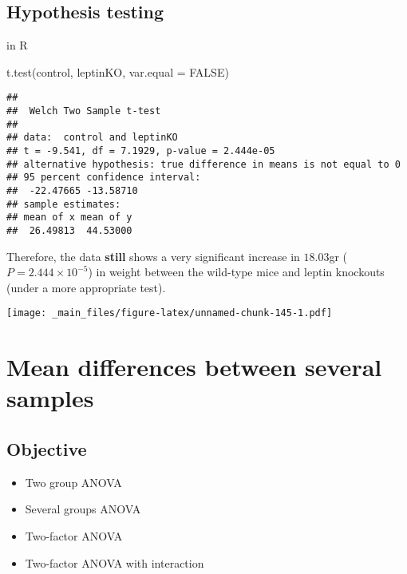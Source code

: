 \documentclass[
]{book}
\newenvironment{Shaded}{\begin{snugshade}}{\end{snugshade}}
\newcommand{\AttributeTok}[1]{\textcolor[rgb]{0.77,0.63,0.00}{#1}}
\newcommand{\ConstantTok}[1]{\textcolor[rgb]{0.00,0.00,0.00}{#1}}
\newcommand{\FunctionTok}[1]{\textcolor[rgb]{0.00,0.00,0.00}{#1}}
\newcommand{\NormalTok}[1]{#1}
\providecommand{\tightlist}{%
  \setlength{\itemsep}{0pt}\setlength{\parskip}{0pt}}
\begin{document}
\hypertarget{hypothesis-testing-5}{%
\section{Hypothesis testing}\label{hypothesis-testing-5}}

in R

\begin{Shaded}
\begin{Highlighting}[]
\FunctionTok{t.test}\NormalTok{(control, leptinKO, }\AttributeTok{var.equal =} \ConstantTok{FALSE}\NormalTok{)}
\end{Highlighting}
\end{Shaded}

\begin{verbatim}
## 
##  Welch Two Sample t-test
## 
## data:  control and leptinKO
## t = -9.541, df = 7.1929, p-value = 2.444e-05
## alternative hypothesis: true difference in means is not equal to 0
## 95 percent confidence interval:
##  -22.47665 -13.58710
## sample estimates:
## mean of x mean of y 
##  26.49813  44.53000
\end{verbatim}

Therefore, the data \textbf{still} shows a very significant increase in \(18.03\)gr (\(P=2.444 \times 10^{-5}\)) in weight between the wild-type mice and leptin knockouts (under a more appropriate test).

\texttt{[image: \_main\_files/figure-latex/unnamed-chunk-145-1.pdf]}

\hypertarget{mean-differences-between-several-samples}{%
\chapter{Mean differences between several samples}\label{mean-differences-between-several-samples}}

\hypertarget{objective-16}{%
\section{Objective}\label{objective-16}}

\begin{itemize}
\tightlist
\item
  Two group ANOVA
\item
  Several groups ANOVA
\item
  Two-factor ANOVA
\item
  Two-factor ANOVA with interaction
\end{itemize}
\end{document}
